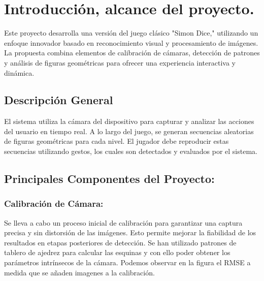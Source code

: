 \chapter{Introducción, alcance del proyecto.}

Este proyecto desarrolla una versión del juego clásico "Simon Dice," utilizando un enfoque innovador basado en reconocimiento visual y procesamiento de imágenes. La propuesta combina elementos de calibración de cámaras, detección de patrones y análisis de figuras geométricas para ofrecer una experiencia interactiva y dinámica.

\section{Descripción General}
El sistema utiliza la cámara del dispositivo para capturar y analizar las acciones del usuario en tiempo real. A lo largo del juego, se generan secuencias aleatorias de figuras geométricas para cada nivel. El jugador debe reproducir estas secuencias utilizando gestos, los cuales son detectados y evaluados por el sistema.

\section{Principales Componentes del Proyecto:}
\subsection{Calibración de Cámara:}
Se lleva a cabo un proceso inicial de calibración para garantizar una captura precisa y sin distorsión de las imágenes. Esto permite mejorar la fiabilidad de los resultados en etapas posteriores de detección. Se han utilizado patrones de tablero de ajedrez para calcular las esquinas y con ello poder obtener los parámetros intrínsecos de la cámara. Podemos observar en la figura el RMSE a medida que se añaden imagenes a la calibración.

